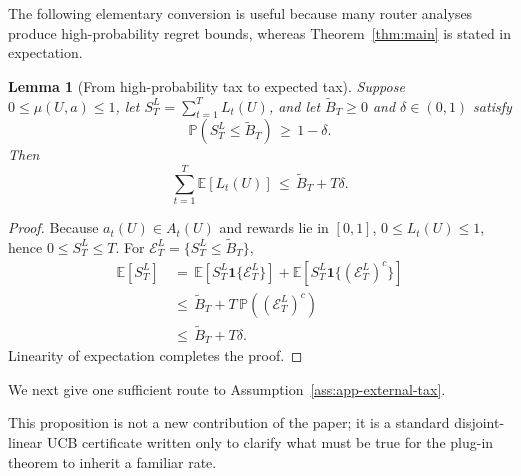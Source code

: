 \documentclass{article} %
\newtheorem{lemma}[theorem]{Lemma}
\begin{document}
The following elementary conversion is useful because many router analyses produce high-probability regret bounds, whereas Theorem~\ref{thm:main} is stated in expectation.

\begin{lemma}[From high-probability tax to expected tax]
\label{lem:4}
Suppose \(0\leq\mu(U,a)\leq1\), let
\(S_T^L=\sum_{t=1}^T L_t(U)\), and let
\(\widetilde B_T\geq0\) and \(\delta\in(0,1)\) satisfy
\begin{equation}
\mathbb{P}\!\left(S_T^{L}\leq \widetilde{B}_T\right)
\,\geq\,
1-\delta.
\end{equation}
Then
\begin{equation}
\sum_{t=1}^{T}\mathbb{E}[L_t(U)]
\,\leq\,
\widetilde{B}_T+T\delta.
\end{equation}
\end{lemma}

\begin{proof}
Because \(a_t(U)\in A_t(U)\) and rewards lie in \([0,1]\),
\(0\leq L_t(U)\leq1\), hence \(0\leq S_T^L\leq T\).  For
\(\mathcal E_T^L=\{S_T^L\leq\widetilde B_T\}\),
\begin{equation}
\begin{aligned}
\mathbb{E}[S_T^{L}]
&\,=\,
\mathbb{E}[S_T^{L}\mathbf{1}\{\mathcal{E}_T^{L}\}]
+
\mathbb{E}[S_T^{L}\mathbf{1}\{(\mathcal{E}_T^{L})^c\}]
\\
&\,\le\,
\widetilde{B}_T
+
T\,\mathbb{P}((\mathcal{E}_T^{L})^c)
\\
&\,\le\,
\widetilde{B}_T
+
T\delta.
\end{aligned}
\end{equation}
Linearity of expectation completes the proof.
\end{proof}

We next give one sufficient route to Assumption~\ref{ass:app-external-tax}.

This proposition is not a new contribution of the paper; it is a standard disjoint-linear UCB certificate written only to clarify what must be true for the plug-in theorem to inherit a familiar rate.
\end{document}
